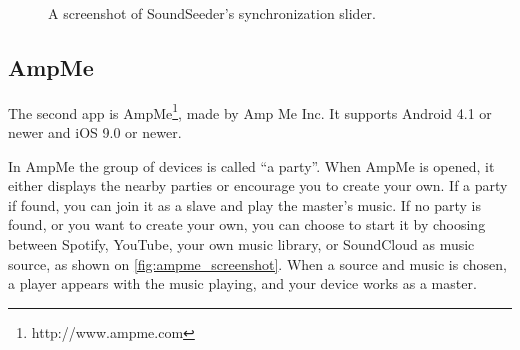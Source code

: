 \begin{figure}[h!]
\begin{minipage}[b]{0.45\textwidth}
        \caption{A screenshot of SoundSeeder's synchronization slider.}\label{fig:soundseeder_slider}
    \end{minipage}
\end{figure}

\subsection{AmpMe}\label{subsec:ampme}
The second app is AmpMe\footnote{http://www.ampme.com}, made by Amp Me Inc.
It supports Android 4.1 or newer and iOS 9.0 or newer.

In AmpMe the group of devices is called ``a party''.
When AmpMe is opened, it either displays the nearby parties or encourage you to create your own. 
If a party if found, you can join it as a slave and play the master's music.
If no party is found, or you want to create your own, you can choose to start it by choosing between Spotify, 
YouTube, your own music library, or SoundCloud as music source, as shown on \cref{fig:ampme_screenshot}. 
When a source and music is chosen, a player appears with the music playing,
and your device works as a master.


